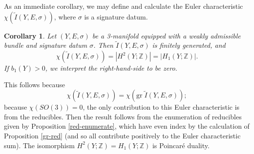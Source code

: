 \documentclass{memo-l}
\newtheorem{corollary}[theorem]{Corollary}
\theoremstyle{definition}
\theoremstyle{remark}
\numberwithin{section}{chapter}
\numberwithin{equation}{chapter}
\begin{document}
As an immediate corollary, we may define and calculate the Euler characteristic $\chi(\widetilde{I}(Y,E,\sigma))$, where $\sigma$ is a signature datum.

\begin{corollary}Let $(Y,E,\sigma)$ be a 3-manifold equipped with a weakly admissible bundle and signature datum $\sigma$. Then $\widetilde{I}(Y,E, \sigma)$ is finitely generated, and 
$$\chi(\widetilde{I}(Y,E, \sigma)) = |H^2(Y;\mathbb Z)| = |H_1(Y;\mathbb Z)|.$$ 
If $b_1(Y) > 0$, we interpret the right-hand-side to be zero.
\end{corollary}

This follows because $$\chi(\widetilde{I}(Y,E, \sigma)) = \chi(\text{gr} \;\widetilde{I}(Y,E, \sigma));$$ because $\chi(SO(3)) = 0$, the only contribution to this Euler characteristic is from the reducibles. Then the result follows from the enumeration of reducibles given by Proposition \ref{red-enumerate}, which have even index by the calculation of Proposition \ref{gr-red} (and so all contribute positively to the Euler characteristic sum). The isomorphism $H^2(Y;\mathbb Z) = H_1(Y;\mathbb Z)$ is Poincar\'e duality.
\end{document}

